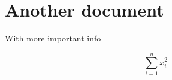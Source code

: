 \documentclass{article}
\begin{document}
\section{Another document}

With more important info

\begin{equation}
\sum_{i = 1}^{n} x_i^2
\end{equation}
\end{document}
